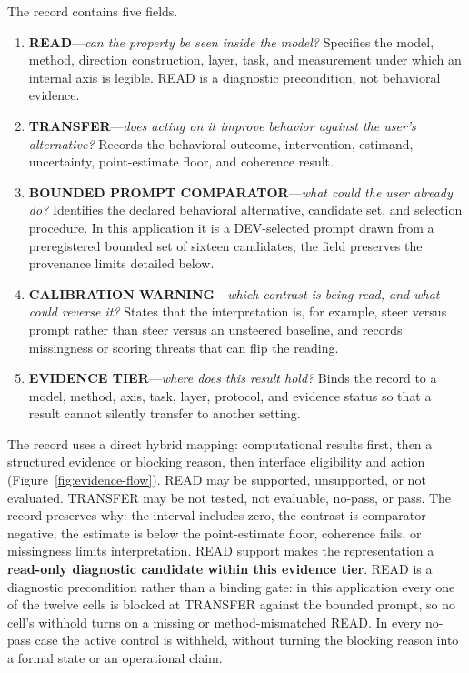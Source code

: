\documentclass[manuscript,review,anonymous]{acmart}
\providecommand{\tightlist}{%
  \setlength{\itemsep}{0pt}\setlength{\parskip}{0pt}}
\begin{document}
The record contains five fields.

\begin{enumerate}
\def\labelenumi{\arabic{enumi}.}
\tightlist
\item
  \textbf{READ}---\emph{can the property be seen inside the model?} Specifies the model, method, direction construction, layer, task, and measurement under which an internal axis is legible. READ is a diagnostic precondition, not behavioral evidence.
\item
  \textbf{TRANSFER}---\emph{does acting on it improve behavior against the user's alternative?} Records the behavioral outcome, intervention, estimand, uncertainty, point-estimate floor, and coherence result.
\item
  \textbf{BOUNDED PROMPT COMPARATOR}---\emph{what could the user already do?} Identifies the declared behavioral alternative, candidate set, and selection procedure. In this application it is a DEV-selected prompt drawn from a preregistered bounded set of sixteen candidates; the field preserves the provenance limits detailed below. {}%
\item
  \textbf{CALIBRATION WARNING}---\emph{which contrast is being read, and what could reverse it?} States that the interpretation is, for example, steer versus prompt rather than steer versus an unsteered baseline, and records missingness or scoring threats that can flip the reading.
\item
  \textbf{EVIDENCE TIER}---\emph{where does this result hold?} Binds the record to a model, method, axis, task, layer, protocol, and evidence status so that a result cannot silently transfer to another setting.
\end{enumerate}

The record uses a direct hybrid mapping: computational results first, then a structured evidence or blocking reason, then interface eligibility and action (Figure~\ref{fig:evidence-flow}). READ may be supported, unsupported, or not evaluated. TRANSFER may be not tested, not evaluable, no-pass, or pass. The record preserves why: the interval includes zero, the contrast is comparator-negative, the estimate is below the point-estimate floor, coherence fails, or missingness limits interpretation. READ support makes the representation a \textbf{read-only diagnostic candidate within this evidence tier}. READ is a diagnostic precondition rather than a binding gate: in this application every one of the twelve cells is blocked at TRANSFER against the bounded prompt, so no cell's withhold turns on a missing or method-mismatched READ. In every no-pass case the active control is withheld, without turning the blocking reason into a formal state or an operational claim. {}%
{}%
\end{document}
